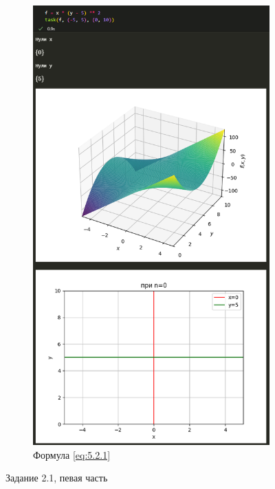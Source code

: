 \documentclass[14pt,a4paper]{extarticle}
\begin{document}
\begin{figure}
\begin{subfigure}{0.48\linewidth}
        \includegraphics[width=0.95\linewidth]{figures/5.2/1.1.png}
        \caption{Формула \ref{eq:5.2.1}}
        \label{pic:5.2.1}
    \end{subfigure}
    \caption{Задание 2.1, певая часть}
\end{figure}\newpage
\end{document}
